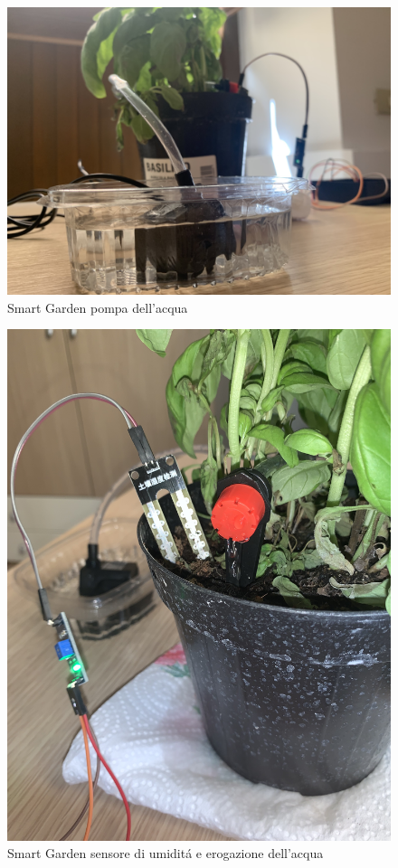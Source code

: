 \begin{figure}
    \centering
    \includegraphics[width=12cm]{Immagini/smart_garden_2}
    \caption{Smart Garden pompa dell'acqua}
    \label{fig:smart_garden_2}
\end{figure}

\begin{figure}
    \centering
    \includegraphics[width=12cm]{Immagini/smart_garden_3}
    \caption{Smart Garden sensore di umidit\'a e erogazione dell'acqua}
    \label{fig:smart_garden_3}
\end{figure}

